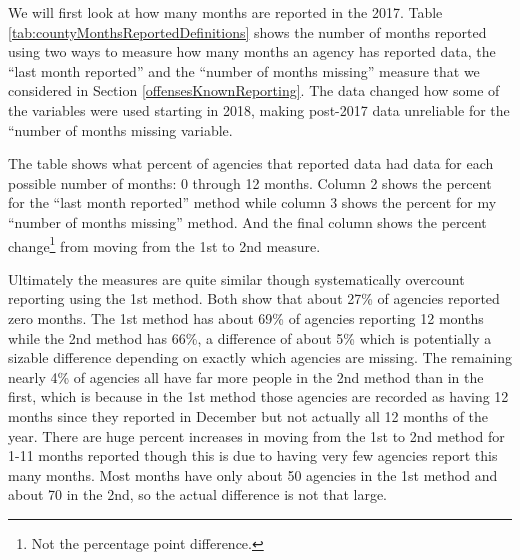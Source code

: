 \documentclass[
]{krantz}
\begin{document}
We will first look at how many months are reported in the
2017. Table \ref{tab:countyMonthsReportedDefinitions} shows
the number of months reported using two ways to measure how
many months an agency has reported data, the ``last month
reported'' and the ``number of months missing'' measure that
we considered in Section \ref{offensesKnownReporting}. The
data changed how some of the variables were used starting in
2018, making post-2017 data unreliable for the ``number of
months missing variable.

The table shows what percent of agencies that reported data
had data for each possible number of months: 0 through 12
months. Column 2 shows the percent for the ``last month
reported'' method while column 3 shows the percent for my
``number of months missing'' method. And the final column
shows the percent change\footnote{Not the percentage point
  difference.} from moving from the 1st to 2nd measure.

Ultimately the measures are quite similar though
systematically overcount reporting using the 1st method.
Both show that about 27\% of agencies reported zero months.
The 1st method has about 69\% of agencies reporting 12
months while the 2nd method has 66\%, a difference of about
5\% which is potentially a sizable difference depending on
exactly which agencies are missing. The remaining nearly 4\%
of agencies all have far more people in the 2nd method than
in the first, which is because in the 1st method those
agencies are recorded as having 12 months since they
reported in December but not actually all 12 months of the
year. There are huge percent increases in moving from the
1st to 2nd method for 1-11 months reported though this is
due to having very few agencies report this many months.
Most months have only about 50 agencies in the 1st method
and about 70 in the 2nd, so the actual difference is not
that large.
\end{document}
